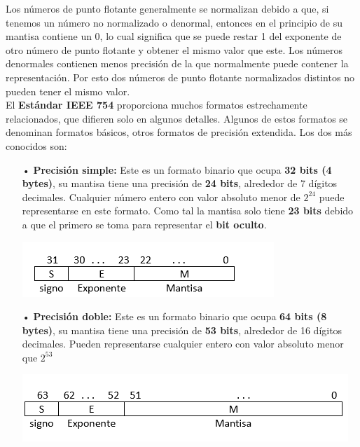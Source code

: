 \documentclass[a4paper,10pt,twocolumn]{article}
\begin{document}
	Los números de punto flotante generalmente se normalizan debido a que, si tenemos un número no normalizado o denormal, entonces en el principio de su mantisa contiene un 0, lo cual significa que se puede restar 1 del exponente de otro número de punto flotante y obtener el mismo valor que este. Los números denormales contienen menos precisión de la que normalmente puede contener la representación. Por esto dos números de punto flotante normalizados distintos no pueden tener el mismo valor. \\
	
	
	
	
	El \textbf{Estándar IEEE 754} proporciona muchos formatos estrechamente relacionados, que difieren solo en algunos detalles. Algunos de estos formatos se denominan formatos básicos, otros formatos de precisión extendida. Los dos más conocidos son: \\
	\begin{itemize}
		\item[•] \textbf{Precisión simple:} Este es un formato binario que ocupa \textbf{32 bits (4 bytes)}, su mantisa tiene una precisión de \textbf{24 bits}, alrededor de 7 dígitos decimales. Cualquier número entero con valor absoluto menor de $2^{24}$ puede representarse en este formato. Como tal la mantisa solo tiene \textbf{23 bits} debido a que el primero se toma para representar el \textbf{bit oculto}.
		\begin{center}
			\includegraphics[scale=0.8]{representacion.png}
		\end{center}
		\item[•] \textbf{Precisión doble:} Este es un formato binario que ocupa \textbf{64 bits (8 bytes)}, su mantisa tiene una precisión de \textbf{53 bits}, alrededor de 16 dígitos decimales. Pueden representarse cualquier entero con valor absoluto menor que $2^{53}$  
		\begin{center}
			\includegraphics[scale=0.5]{representacion2.png}
		\end{center}
		
	\end{itemize}
	
\end{document}
